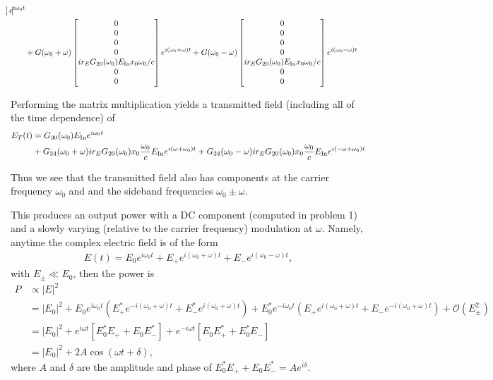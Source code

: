 \documentclass[11pt]{article}
\begin{document}
\begin{enumerate}
\begin{itemize}
\begin{align}
\begin{bmatrix}
\end{bmatrix}
e^{i\omega_0 t} \nonumber \\
&+G(\omega_0 +\omega)
\begin{bmatrix}
0 \\ 0 \\ 0 \\0 \\ ir_EG_{20}(\omega_0)E_{\rm In}x_0\omega_0/c \\ 0 \\0
\end{bmatrix}
e^{i(\omega_0+\omega)t}
+G(\omega_0 -\omega)
\begin{bmatrix}
0 \\ 0 \\ 0 \\0 \\ ir_EG_{20}(\omega_0)E_{\rm In}x_0\omega_0/c \\ 0 \\0
\end{bmatrix}
e^{i(\omega_0-\omega)t}
\end{align}

Performing the matrix multiplication yields a transmitted field (including all of the time dependence) of
\begin{align}
E_T(t)&=G_{30}(\omega_0)E_{\rm In}e^{i\omega_0 t} \nonumber \\
&+G_{34}(\omega_0+\omega)ir_EG_{20}(\omega_0)x_0\frac{\omega_0}{c}E_{\rm In}e^{i(\omega+\omega_0)t}
+G_{34}(\omega_0-\omega)ir_EG_{20}(\omega_0)x_0\frac{\omega_0}{c}E_{\rm In}e^{i(-\omega+\omega_0)t} \label{eq:ETmod}
\end{align}

Thus we see that the transmitted field also has components at the carrier frequency $\omega_0$ and and the sideband frequencies $\omega_0\pm \omega$.

This produces an output power with a DC component  (computed in problem 1) and a slowly varying (relative to the carrier frequency) modulation at $\omega$. Namely, anytime the complex electric field is of the form
\begin{align}
E(t)=E_0e^{i\omega_0 t}+E_+e^{i(\omega_0+\omega)t}+E_-e^{i(\omega_0-\omega)t},
\end{align}
with $E_\pm\ll E_0$, then
the power is
\begin{align}
P&\propto |E|^2 \nonumber \\
&=|E_0|^2+E_0 e^{i\omega_0 t}(E_+^*e^{-i(\omega_0+\omega)t}+E_-^*e^{i(\omega_0+\omega)t}) +E_0^* e^{-i\omega_0 t}(E_+e^{i(\omega_0+\omega)t}+E_-e^{-i(\omega_0+\omega)t}) +\mathcal{O}(E_\pm^2) \nonumber \\
&=|E_0|^2+e^{i\omega t}\left[E_0^*E_++E_0E_-^*\right]+e^{-i\omega t}\left[E_0E_+^*+E_0^*E_-\right] \nonumber \\
&=|E_0|^2 +2A\cos(\omega t+\delta),
\end{align}
where $A$ and $\delta$ are the amplitude and phase of $E_0^*E_++E_0E_-^*=Ae^{i\delta}$.


\end{itemize}
\end{enumerate}
\end{document}
